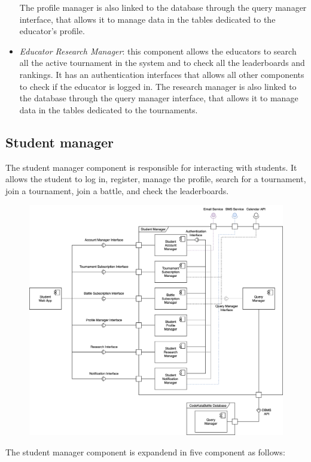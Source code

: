 \documentclass[12pt, a4paper]{report}
\begin{document}
\begin{itemize}
            The profile manager is also linked to the database through the query manager interface, that allows it to manage data in the tables dedicated to the educator's profile.
        \item \textit{Educator Research Manager}: this component allows the educators to search all the active tournament in the system and to check all the leaderboards and rankings. 
            It has an authentication interfaces that allows all other components to check if the educator is logged in.
            The research manager is also linked to the database through the query manager interface, that allows it to manage data in the tables dedicated to the tournaments.
    \end{itemize}

    \subsection{Student manager}
    The student manager component is responsible for interacting with students.
    It allows the student to log in, register, manage the profile, search for a tournament, join a tournament, join a battle, and check the leaderboards.  
    \begin{figure}[H]
        \centering
        \includegraphics[width=0.8\linewidth]{images/component_view_student.png}
    \end{figure}
    The student manager component is expandend in five component as follows: 
\end{document}
